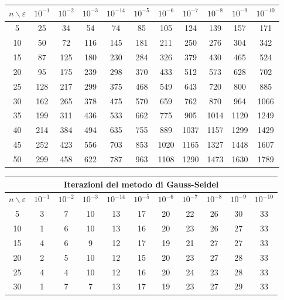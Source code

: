 \begin{sol}
\begin{center}
\begin{tabular}{|c||c|c|c|c|c|c|c|c|c|c|}
        $n \backslash \varepsilon $ & $10^{-1}$& $10^{-2}$& $10^{-3}$& $10^{-14}$& $10^{-5}$& $10^{-6}$& $10^{-7}$& $10^{-8}$& $10^{-9}$& $10^{-10}$\\\hline
        5& 25 & 34 & 54 & 74 & 85 & 105 & 124 & 139 & 157 & 171 \\\hline
        10& 50 & 72 & 116 & 145 & 181 & 211 & 250 & 276 & 304 & 342 \\\hline
        15& 87 & 125 & 180 & 230 & 284 & 326 & 379 & 430 & 465 & 524 \\ \hline
        20& 95 & 175 & 239 & 298 & 370 & 433 & 512 & 573 & 628 & 702 \\\hline
        25& 128 & 217 & 299 & 375 & 468 & 549 & 643 & 720 & 800 & 885 \\ \hline
        30& 162 & 265 & 378 & 475 & 570 & 659 & 762 & 870 & 964 & 1066 \\ \hline
        35& 199 & 311 & 436 & 533 & 662 & 775 & 905 & 1014 & 1120 & 1249 \\ \hline
        40& 214 & 384 & 494 & 635 & 755 & 889 & 1037 & 1157 & 1299 & 1429 \\ \hline
        45& 252 & 423 & 556 & 703 & 853 & 1020 & 1165 & 1327 & 1448 & 1607 \\ \hline
        50& 299 & 458 & 622 & 787 & 963 & 1108 & 1290 & 1473 & 1630 & 1789 \\\hline
        \end{tabular}\end{center}
        \begin{center}\begin{tabular}{|c||c|c|c|c|c|c|c|c|c|c|}
        \hline\multicolumn{11}{c}{Iterazioni del metodo di Gauss-Seidel}\\\hline
        $n \backslash \varepsilon $ & $10^{-1}$& $10^{-2}$& $10^{-3}$& $10^{-14}$& $10^{-5}$& $10^{-6}$& $10^{-7}$& $10^{-8}$& $10^{-9}$& $10^{-10}$\\\hline
        5 & 3 & 7 & 10 & 13 & 17 & 20 & 22 & 26 & 30 & 33 \\\hline
        10 & 1 & 6 & 10 & 13 & 16 & 20 & 23 & 26 & 27 & 33 \\\hline
        15 & 4 & 6 & 9 & 12 & 17 & 19 & 21 & 27 & 27 & 33 \\ \hline
        20 & 2 & 5 & 10 & 12 & 15 & 20 & 23 & 27 & 28 & 33 \\ \hline
        25 & 4 & 4 & 10 & 12 & 16 & 20 & 24 & 23 & 28 & 33 \\ \hline
        30 & 1 & 7 & 7 & 13 & 17 & 19 & 23 & 27 & 29 & 33 \\ \hline

\end{tabular}
\end{center}
\end{sol}
